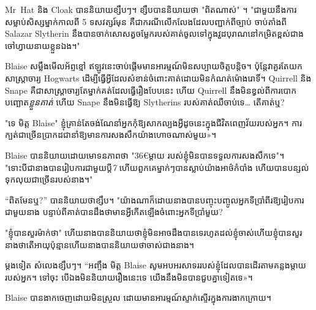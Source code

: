 Mr~Hat និង Cloak បាននិយាយខ្សឹបៗ។ ខ្សឹបបាននិយាយថា "ពិតណាស់" ។ "ជាមួយនឹងការសម្លាប់សិស្សម្នាក់កាលពី 5 ទសវត្សរ៍មុន គឺជាករណីលើកលែងដែលបញ្ជាក់ពីច្បាប់ ចាប់តាំងពី Salazar Slytherin នឹងបានចាក់សោសត្វចម្លែករបស់គាត់ចូលទៅក្នុងវួដបុរាណនៅកម្រិតខ្ពស់ជាងចៅហ្វាយនាយខ្លួនឯង។"

Blaise សម្លឹងមើលអ័ព្ទខ្មៅ ឥឡូវនេះចាប់ផ្តើមមានអារម្មណ៍មិនសប្បាយចិត្តបន្តិច។ ប៉ុន្តែវាគួរតែយកសាស្រ្តាចារ្យ Hogwarts ដើម្បីធ្វើអ្វីដែលសំខាន់ចំពោះគាត់ដោយមិនកំណត់ម៉ោងរោទិ៍។ Quirrell និង Snape គឺជាសាស្ត្រាចារ្យតែម្នាក់គត់ដែលធ្វើរឿងបែបនេះ ហើយ Quirrell នឹងមិនខ្វល់ពីការបោកបញ្ឆោត\emph{ខ្លួនគាត់} ហើយ Snape នឹងមិនធ្វើឱ្យ Slytherins របស់គាត់ឈឺចាប់ទេ… តើគាត់ឬ?

"ទេ មិត្ត Blaise" ខ្ញុំគ្រាន់តែចង់ណែនាំអ្នកកុំឱ្យសាកល្បងអ្វីដូចនេះក្នុងជីវិតពេញវ័យរបស់អ្នក។ ការ​ក្បត់​ជា​ច្រើន​ប្រាកដ​ជា​នាំ​ឱ្យ​មាន​ការ​សងសឹក​យ៉ាង​ហោច​ណាស់​មួយ»។

Blaise បាននិយាយដោយមោទនភាពថា "36€{ម្តាយ} របស់ខ្ញុំមិនបានទទួលការសងសឹកទេ"។ "ទោះបីជានាងបានរៀបការជាមួយប្តី\emph{7} ហើយពួកគេម្នាក់ៗបានស្លាប់យ៉ាងអាថ៌កំបាំង ហើយបានបន្សល់ទុកលុយជាច្រើនរបស់នាង។"

“ពិតមែនឬ?” បាននិយាយថាខ្សឹប។ "យ៉ាង​ណា​ក៏​ដោយ​នាង​បាន​បញ្ចុះ​បញ្ចូល​អ្នក​ទី​ប្រាំពីរ​ឱ្យ​រៀបការ​ជាមួយ​នាង បន្ទាប់​ពី​គាត់​បាន​ដឹង​ថា​មាន​អ្វី​កើត​ឡើង​ចំពោះ​អ្នក​ទី​ប្រាំ​មួយ?

"ខ្ញុំបានសួរម៉ាក់ថា" ហើយនាងបាននិយាយថាខ្ញុំមិនអាចដឹងបានទេរហូតដល់ខ្ញុំចាស់ហើយខ្ញុំបានសួរនាងថាតើអាយុប៉ុន្មានហើយនាងបាននិយាយថាចាស់ជាងនាង។

ម្តងទៀត សំលេងខ្សឹបៗ។ “អញ្ចឹង មិត្ត Blaise សូមអបអរសាទររបស់ខ្ញុំដែលបានដើរតាមគន្លងម្តាយរបស់អ្នក។ ទៅ​ចុះ បើ​ឯង​មិន​និយាយ​រឿង​នេះ​ទេ យើង​នឹង​មិន​បាន​ជួប​គ្នា​ទៀត​ទេ»។

Blaise បាន​ងាក​ចេញ​ដោយ​មិន​ស្រួល ដោយ​មាន​អារម្មណ៍​ស្ទាក់​ស្ទើរ​ក្នុង​ការ​ងាក​ក្រោយ។

